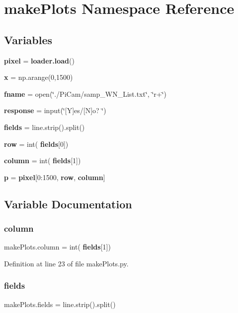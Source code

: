 \section{make\+Plots Namespace Reference}
\label{namespacemake_plots}
\subsection*{Variables}
\begin{DoxyCompactItemize}
\item 
\textbf{ pixel} = \textbf{ loader.\+load}()
\item 
\textbf{ x} = np.\+arange(0,1500)
\item 
\textbf{ fname} = open(\char`\"{}./Pi\+Cam/samp\+\_\+\+W\+N\+\_\+\+List.\+txt\char`\"{}, \char`\"{}r+\char`\"{})
\item 
\textbf{ response} = input(\char`\"{}[Y]es/[N]o? \char`\"{})
\item 
\textbf{ fields} = line.\+strip().split()
\item 
\textbf{ row} = int(\textbf{ fields}[0])
\item 
\textbf{ column} = int(\textbf{ fields}[1])
\item 
\textbf{ p} = \textbf{ pixel}[0\+:1500, \textbf{ row}, \textbf{ column}]
\end{DoxyCompactItemize}


\subsection{Variable Documentation}
\mbox{\label{namespacemake_plots_aaa96a7fc28779922ea7a7710b5e0a1cc}} 
\subsubsection{column}
{\footnotesize\ttfamily make\+Plots.\+column = int(\textbf{ fields}[1])}



Definition at line 23 of file make\+Plots.\+py.

\mbox{\label{namespacemake_plots_a71adf1a956f4892a354573069820e270}} 
\subsubsection{fields}
{\footnotesize\ttfamily make\+Plots.\+fields = line.\+strip().split()}



